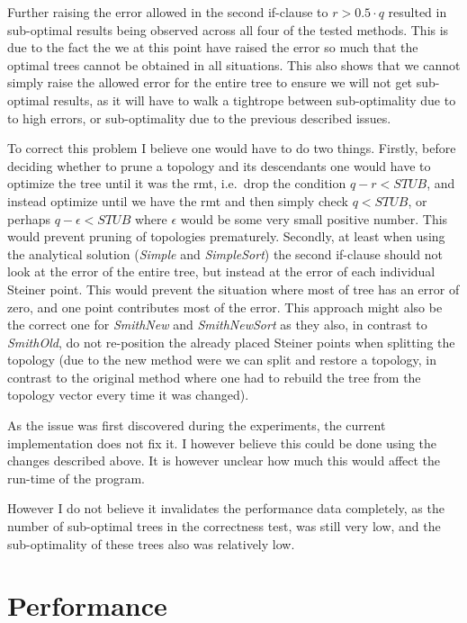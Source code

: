 Further raising the error allowed in the second if-clause to $r > 0.5 \cdot q$
resulted in sub-optimal results being observed across all four of the tested
methods. This is due to the fact the we at this point have raised the error so
much that the optimal trees cannot be obtained in all situations. This also
shows that we cannot simply raise the allowed error for the entire tree to
ensure we will not get sub-optimal results, as it will have to walk a tightrope
between sub-optimality due to to high errors, or sub-optimality due to the
previous described issues.

To correct this problem I believe one would have to do two things. Firstly,
before deciding whether to prune a topology and its descendants one would have
to optimize the tree until it was the \ac{rmt}, i.e.\ drop the condition $q-r <
\textit{STUB}$, and instead optimize until we have the \ac{rmt} and then simply
check $q < \textit{STUB}$, or perhaps $q - \epsilon < \textit{STUB}$ where
$\epsilon$ would be some very small positive number. This would prevent pruning
of topologies prematurely. Secondly, at least when using the analytical solution
(\textit{Simple} and \textit{SimpleSort}) the second if-clause should not look
at the error of the entire tree, but instead at the error of each individual
Steiner point. This would prevent the situation where most of tree has an error
of zero, and one point contributes most of the error. This approach might also
be the correct one for \textit{SmithNew} and \textit{SmithNewSort} as they also, in
contrast to \textit{SmithOld}, do not re-position the already placed Steiner
points when splitting the topology (due to the new method were we can split and
restore a topology, in contrast to the original method where one had to rebuild the
tree from the topology vector every time it was changed).

As the issue was first discovered during the experiments, the current
implementation does not fix it. I however believe this could be done using the
changes described above. It is however unclear how much this would affect the
run-time of the program.

However I do not believe it invalidates the performance data completely, as the
number of sub-optimal trees in the correctness test, was still very low, and the
sub-optimality of these trees also was relatively low.

\section{Performance}
\label{sec:performance}

